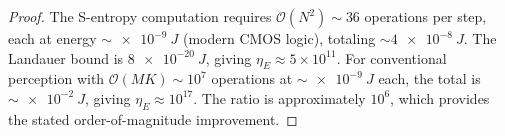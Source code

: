 \documentclass[twocolumn,10pt]{article}
\theoremstyle{definition}
\theoremstyle{remark}
\newcommand{\Ocal}{\mathcal{O}}
\begin{document}
\begin{proof}
The S-entropy computation requires $\Ocal(N^2) \sim 36$ operations per
step, each at energy $\sim\!\SI{e-9}{J}$ (modern CMOS logic), totaling
$\sim\!\SI{4e-8}{J}$. The Landauer bound is $\SI{8e-20}{J}$, giving
$\eta_E \approx 5 \times 10^{11}$. For conventional perception with
$\Ocal(MK) \sim 10^7$ operations at $\sim\!\SI{e-9}{J}$ each,
the total is $\sim\!\SI{e-2}{J}$, giving $\eta_E \approx 10^{17}$.
The ratio is approximately $10^{6}$, which provides the stated
order-of-magnitude improvement.
\end{proof}
\end{document}
